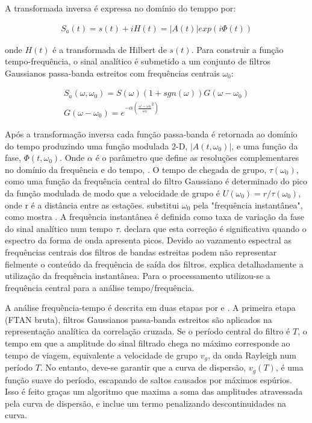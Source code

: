 A transformada inversa é expressa no domínio do temppo por:

\begin{eqnarray}
S_{a}(t) = s(t) + iH(t) = \left | A(t) \right |exp(i\Phi(t))
\end{eqnarray}

onde $H(t)$ é a transformada de Hilbert de $s(t)$. Para construir a função tempo-frequência, o sinal analítico é submetido a um conjunto de filtros Gaussianos passa-banda estreitos com frequências centrais $\omega _{0}$:

\begin{eqnarray}
S_{a}(\omega,\omega _{0}) = S(\omega)(1 + sgn(\omega))G(\omega - \omega _{0})
\\
G(\omega - \omega _{0}) = e^{-\alpha(\frac{\omega - \omega _{0}}{\omega _{0}}^{2})}
\end{eqnarray}

Após a transformação inversa cada função passa-banda é retornada ao domínio do tempo produzindo uma função modulada 2-D, $\left | A(t,\omega _{0}) \right |$, e uma função da fase, $ \Phi(t,\omega _{0}) $. Onde $\alpha$ é o parâmetro que define as resoluções complementares no domínio da frequência e do tempo, \cite{levshin_automated_2001}. O tempo de chegada de grupo, $\tau (\omega _{0})$, como uma função da frequência central do filtro Gaussiano é determinado do pico da função modulada de modo que a velocidade de grupo é $U(\omega _{0})=r/\tau (\omega _{0})$, onde r é a distância entre as estações. \cite{bensen_processing_2007} substitui $\omega _{0}$ pela "frequência instantânea", como mostra \cite{bracewell_fourier_1978}. A frequência instantânea é definida como taxa de variação da fase do sinal analítico num tempo $\tau$. \cite{bensen_processing_2007} declara que esta correção é significativa quando o espectro da forma de onda apresenta picos. Devido ao vazamento espectral as frequências centrais dos filtros de bandas estreitas podem não representar fielmente o conteúdo da frequência de saída dos filtros. \cite{boashash_estimating_1992} explica detalhadamente a utilização da frequência instantânea. Para o processamento utilizou-se a frequência central para a análise tempo/frequência.

A análise frequência-tempo é descrita em duas etapas por \cite{levshin_automated_2001} e \cite{bensen_processing_2007}. A primeira etapa (FTAN bruta), filtros Gaussianos passa-banda estreitos são aplicados na representação analítica da correlação cruzada. Se o período central do filtro é $T$, o tempo em que a amplitude do sinal filtrado chega no máximo corresponde ao tempo de viagem, equivalente a velocidade de grupo $v_{g}$, da onda Rayleigh num período $T$. No entanto, deve-se garantir que a curva de dispersão, $v_{g}(T)$, é uma função suave do período, escapando de saltos causados por máximos espúrios. Isso é feito graças um algoritmo que maxima a soma das amplitudes atravessada pela curva de dispersão, e inclue um termo penalizando descontinuidades na curva.


